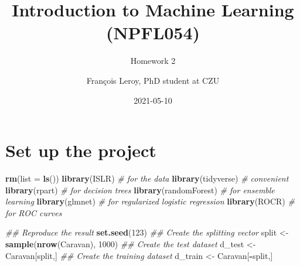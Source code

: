 \documentclass[
  12pt,
  oneside]{report}
\title{Introduction to Machine Learning\\
(NPFL054)}
\subtitle{Homework 2}
\author{François Leroy, PhD student at CZU}
\date{2021-05-10}
\newenvironment{Shaded}{\begin{snugshade}}{\end{snugshade}}
\newcommand{\CommentTok}[1]{\textcolor[rgb]{0.56,0.35,0.01}{\textit{#1}}}
\newcommand{\DataTypeTok}[1]{\textcolor[rgb]{0.13,0.29,0.53}{#1}}
\newcommand{\DecValTok}[1]{\textcolor[rgb]{0.00,0.00,0.81}{#1}}
\newcommand{\KeywordTok}[1]{\textcolor[rgb]{0.13,0.29,0.53}{\textbf{#1}}}
\newcommand{\NormalTok}[1]{#1}
\newcommand{\OperatorTok}[1]{\textcolor[rgb]{0.81,0.36,0.00}{\textbf{#1}}}
\newcommand{\StringTok}[1]{\textcolor[rgb]{0.31,0.60,0.02}{#1}}
\begin{document}
\maketitle


\cleardoublepage 
{}

{
\hypersetup{linkcolor=}
\setcounter{tocdepth}{1}
\tableofcontents
\newpage
}
\vspace{50mm}


\cleardoublepage 
{}


\hypertarget{set-up-the-project}{%
\chapter*{Set up the project}\label{set-up-the-project}}

\begin{Shaded}
\begin{Highlighting}[]
\KeywordTok{rm}\NormalTok{(}\DataTypeTok{list =} \KeywordTok{ls}\NormalTok{())}
\KeywordTok{library}\NormalTok{(ISLR) }\CommentTok{# for the data}
\KeywordTok{library}\NormalTok{(tidyverse) }\CommentTok{# convenient}
\KeywordTok{library}\NormalTok{(rpart) }\CommentTok{# for decision trees}
\KeywordTok{library}\NormalTok{(randomForest) }\CommentTok{# for ensemble learning}
\KeywordTok{library}\NormalTok{(glmnet) }\CommentTok{# for regularized logistic regression}
\KeywordTok{library}\NormalTok{(ROCR) }\CommentTok{# for ROC curves}
\end{Highlighting}
\end{Shaded}

\begin{Shaded}
\begin{Highlighting}[]
\CommentTok{## Reproduce the result}
\KeywordTok{set.seed}\NormalTok{(}\DecValTok{123}\NormalTok{)}
\CommentTok{## Create the splitting vector}
\NormalTok{split <-}\StringTok{ }\KeywordTok{sample}\NormalTok{(}\KeywordTok{nrow}\NormalTok{(Caravan), }\DecValTok{1000}\NormalTok{)}
\CommentTok{## Create the test dataset}
\NormalTok{d_test <-}\StringTok{ }\NormalTok{Caravan[split,]}
\CommentTok{## Create the training dataset}
\NormalTok{d_train <-}\StringTok{ }\NormalTok{Caravan[}\OperatorTok{-}\NormalTok{split,]}
\end{Highlighting}
\end{Shaded}
\end{document}
